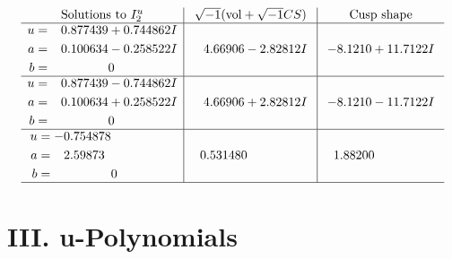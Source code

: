 \documentclass[1p]{elsarticle_modified}
\theoremstyle{definition}
\newcommand{\I}{\sqrt{-1}}
\begin{document}
$$\begin{array}{c|c|c}  
\text{Solutions to }I^u_{2}& \I (\text{vol} + \sqrt{-1}CS) & \text{Cusp shape}\\
 \hline 
\begin{aligned}
u &= \phantom{-}0.877439 + 0.744862 I \\
a &= \phantom{-}0.100634 - 0.258522 I \\
b &= \phantom{-0.000000 } 0\end{aligned}
 & \phantom{-}4.66906 - 2.82812 I & -8.1210 + 11.7122 I \\ \hline\begin{aligned}
u &= \phantom{-}0.877439 - 0.744862 I \\
a &= \phantom{-}0.100634 + 0.258522 I \\
b &= \phantom{-0.000000 } 0\end{aligned}
 & \phantom{-}4.66906 + 2.82812 I & -8.1210 - 11.7122 I \\ \hline\begin{aligned}
u &= -0.754878\phantom{ +0.000000I} \\
a &= \phantom{-}2.59873\phantom{ +0.000000I} \\
b &= \phantom{-0.000000 } 0\end{aligned}
 & \phantom{-}0.531480\phantom{ +0.000000I} & \phantom{-}1.88200\phantom{ +0.000000I}\\
 \hline 
 \end{array}$$\newpage
\newpage\renewcommand{\arraystretch}{1}
\centering \section*{ III. u-Polynomials}
\end{document}
